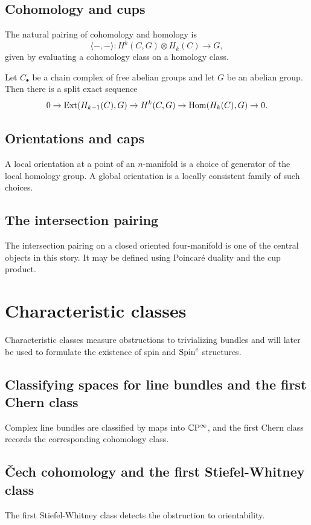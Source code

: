 \subsection{Cohomology and cups}
\begin{definition}
The natural pairing of cohomology and homology is
\[
  \langle -,-\rangle\colon H^k(C,G)\otimes H_k(C)\to G,
\]
given by evaluating a cohomology class on a homology class.
\end{definition}

\begin{theorem}
Let $C_\bullet$ be a chain complex of free abelian groups and let $G$ be an abelian group. Then there is a split exact sequence
\[
0\to \operatorname{Ext}(H_{k-1}(C),G)\to H^k(C,G)\to \operatorname{Hom}(H_k(C),G)\to 0.
\]
\end{theorem}

\subsection{Orientations and caps}
A local orientation at a point of an $n$-manifold is a choice of generator of the local homology group. A global orientation is a locally consistent family of such choices.

\subsection{The intersection pairing}
The intersection pairing on a closed oriented four-manifold is one of the central objects in this story. It may be defined using Poincaré duality and the cup product.

\section{Characteristic classes}
Characteristic classes measure obstructions to trivializing bundles and will later be used to formulate the existence of spin and $\operatorname{Spin}^{c}$ structures.

\subsection{Classifying spaces for line bundles and the first Chern class}
Complex line bundles are classified by maps into $\mathbb{C}\mathrm{P}^\infty$, and the first Chern class records the corresponding cohomology class.

\subsection{Čech cohomology and the first Stiefel-Whitney class}
The first Stiefel-Whitney class detects the obstruction to orientability.

